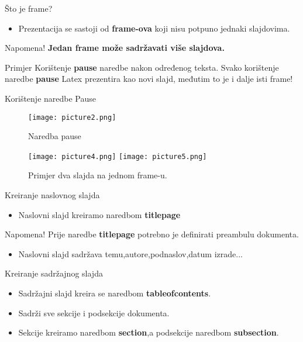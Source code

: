 \documentclass{beamer}
\begin{document}
\begin{frame}{Što je frame?}
		\begin{itemize}
			\item Prezentacija se sastoji od \textbf{frame-ova} koji nisu potpuno jednaki slajdovima.
		\end{itemize}
        \begin{alertblock}{Napomena!}	
        		\textbf{Jedan frame može sadržavati više slajdova.}
        \end{alertblock}
        \begin{block}{Primjer}
            Korištenje \textbf{pause} naredbe nakon određenog teksta.\newline
            Svako korištenje naredbe \textbf{pause} Latex prezentira kao novi slajd, međutim to je i dalje isti frame!
        \end{block}
\end{frame}

\begin{frame}{Korištenje naredbe Pause}
		\begin{figure}
		\texttt{[image: picture2.png]}
		\caption{Naredba pause}
		\end{figure}
		\begin{figure}
		\texttt{[image: picture4.png]}
		\texttt{[image: picture5.png]}
		\caption{Primjer dva slajda na jednom frame-u.}
		\end{figure}
\end{frame}

\begin{frame}{Kreiranje naslovnog slajda}
		\begin{itemize}
			\item Naslovni slajd kreiramo naredbom \textbf{titlepage}
		\end{itemize}
		\begin{alertblock}{Napomena!}	
        	Prije naredbe \textbf{titlepage} potrebno je definirati preambulu dokumenta.
        \end{alertblock}
        \begin{itemize}
        	\item Naslovni slajd sadržava temu,autore,podnaslov,datum izrade...
        \end{itemize}
\end{frame}

\begin{frame}{Kreiranje sadržajnog slajda}
		\begin{itemize}
			\item Sadržajni slajd kreira se naredbom \textbf{tableofcontents}.
			\item Sadrži sve sekcije i podsekcije dokumenta.
			\item Sekcije kreiramo naredbom \textbf{section},a podsekcije naredbom \textbf{subsection}.
		\end{itemize}
\end{frame}
	
\end{document}
